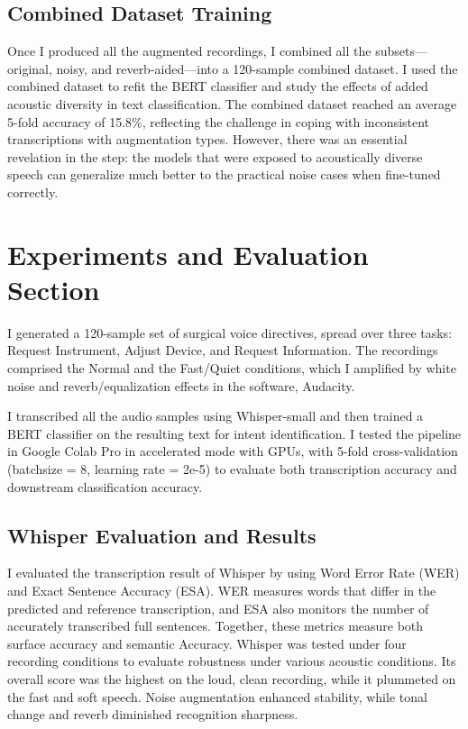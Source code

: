 \documentclass[11pt,a4paper]{article}
\begin{document}
\subsection{Combined Dataset Training}
Once I produced all the augmented recordings, I combined all the subsets—original, noisy, and reverb-aided—into a 120-sample combined dataset. I used the combined dataset to refit the BERT classifier and study the effects of added acoustic diversity in text classification. The combined dataset reached an average 5-fold accuracy of 15.8\%, reflecting the challenge in coping with inconsistent transcriptions with augmentation types. However, there was an essential revelation in the step: the models that were exposed to acoustically diverse speech can generalize much better to the practical noise cases when fine-tuned correctly.

\section{Experiments and Evaluation Section}
I generated a 120-sample set of surgical voice directives, spread over three tasks: Request Instrument, Adjust Device, and Request Information. The recordings comprised the Normal and the Fast/Quiet conditions, which I amplified by white noise and reverb/equalization effects in the software, Audacity.

I transcribed all the audio samples using Whisper-small and then trained a BERT classifier on the resulting text for intent identification. I tested the pipeline in Google Colab Pro in accelerated mode with GPUs, with 5-fold cross-validation (batchsize = 8, learning rate = 2e-5) to evaluate both transcription accuracy and downstream classification accuracy.

\subsection{Whisper Evaluation and Results}
I evaluated the transcription result of Whisper by using Word Error Rate (WER) and Exact Sentence Accuracy (ESA). WER measures words that differ in the predicted and reference transcription, and ESA also monitors the number of accurately transcribed full sentences.
Together, these metrics measure both surface accuracy and semantic Accuracy. Whisper was tested under four recording conditions to evaluate robustness under various acoustic conditions. Its overall score was the highest on the loud, clean recording, while it plummeted on the fast and soft speech. Noise augmentation enhanced stability, while tonal change and reverb diminished recognition sharpness.
\end{document}
